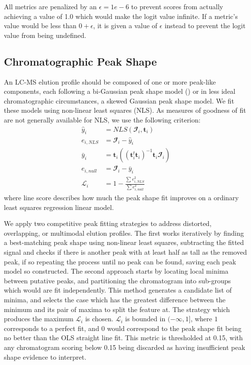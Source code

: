     All metrics are penalized by an $\epsilon = 1e-6$ to prevent scores from actually achieving
    a value of 1.0 which would make the logit value infinite. If a metric's value would be less
    than $0 + \epsilon$, it is given a value of $\epsilon$ instead to prevent the logit value from
    being undefined.

    \subsection{Chromatographic Peak Shape}
        An LC-MS elution profile should be composed of one or more peak-like components, each
        following a bi-Gaussian peak shape model (\cite{Yu2010}) or in less ideal chromatographic
        circumstances, a skewed Gaussian peak shape model. We fit these models using non-linear
        least squares (NLS). As measures of goodness of fit are not generally available for NLS,
        we use the following criterion:
        \begin{align}
            {\hat y_i} &= NLS(\mathbfcal{I}_i, \mathbf{t}_i) \nonumber\\
            e_{i, NLS} &= \mathbfcal{I}_i - {\hat y_i} \nonumber\\
            {\bar y_i} &= \mathbf{t}_i
                \left(
                    \left(
                        \mathbf{t}_i^t\mathbf{t}_i
                    \right)^{-1}\mathbf{t}_i\mathbfcal{I}_i
                \right)\nonumber\\
            e_{i, null} &= \mathbfcal{I}_i - {\bar y_i} \nonumber\\
            \mathscr{L}_i &= 1 - \frac{\sum{e_{i, NLS}^2}}{\sum{e_{i, null}^2}}
        \end{align}
        where line score describes how much the peak shape fit improves on a ordinary least squares
        regression linear model.

        We apply two competitive peak fitting strategies to address distorted, overlapping, or
        multimodal elution profiles. The first works iteratively by finding a best-matching peak
        shape using non-linear least squares, subtracting the fitted signal and checks if there is
        another peak with at least half as tall as the removed peak, if so repeating the process until
        no peak can be found, saving each peak model so constructed. The second approach starts
        by locating local minima between putative peaks, and partitioning the chromatogram into
        sub-groups which would are fit independently. This method generates a candidate list of
        minima, and selects the case which has the greatest difference between the minimum and its
        pair of maxima to split the feature at. The strategy which produces the maximum $\mathscr{L}_i$
        is chosen. $\mathscr{L}_i$ is bounded in $(-\infty, 1]$, where $1$ corresponds to a perfect
        fit, and 0 would correspond to the peak shape fit being no better than the OLS straight line
        fit. This metric is thresholded at 0.15, with any chromatogram scoring below 0.15 being
        discarded as having insufficient peak shape evidence to interpret.

